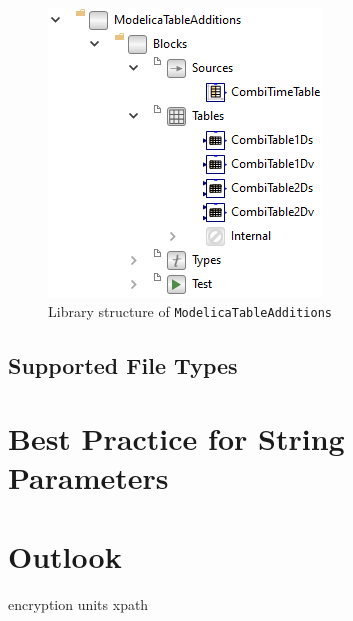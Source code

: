 \documentclass{modelica}
\newcommand{\modelica}[1]{\lstinline[language=modelica]|#1|}
\begin{document}
\begin{figure}[!hb]
\centering
\includegraphics[scale=0.8]{resources/ModelicaTableAdditions.png}
\caption{Library structure of \modelica{ModelicaTableAdditions}}
\label{fig:ModelicaTableAdditions}
\end{figure}

\subsection{Supported File Types}

\section{Best Practice for String Parameters}


\section{Outlook}
encryption
units
xpath



\end{document}
